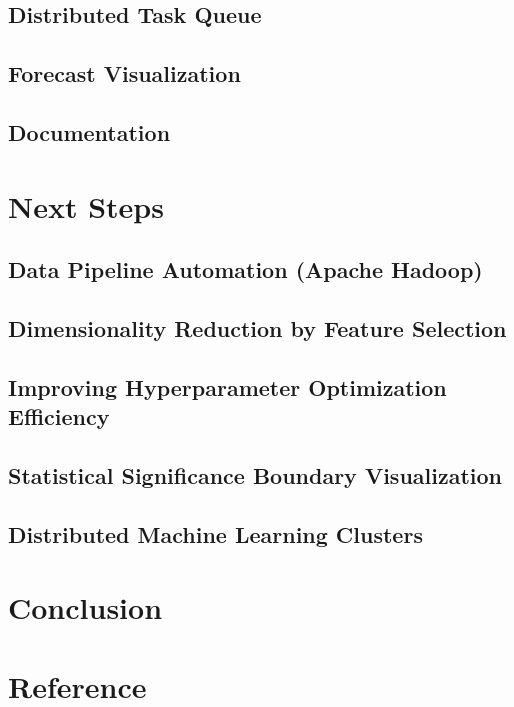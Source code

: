 \documentclass[11pt, oneside]{article}
\begin{document}
\subsection{Distributed Task Queue}
\subsection{Forecast Visualization}
\subsection{Documentation}

\section{Next Steps}
\subsection{Data Pipeline Automation (Apache Hadoop)}
\subsection{Dimensionality Reduction by Feature Selection}
\subsection{Improving Hyperparameter Optimization Efficiency}
\subsection{Statistical Significance Boundary Visualization}
\subsection{Distributed Machine Learning Clusters}

\section{Conclusion}

\section{Reference}




\end{document}
